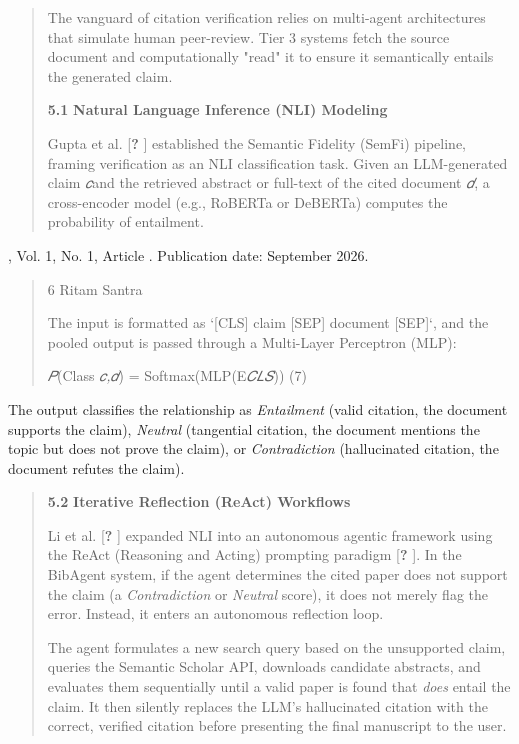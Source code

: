 \documentclass[
]{article}
\begin{document}
\begin{quote}
The vanguard of citation verification relies on multi-agent
architectures that simulate human peer-review. Tier 3 systems fetch the
source document and computationally "read" it to ensure it semantically
entails the generated claim.

\textbf{5.1} \textbf{Natural Language Inference (NLI) Modeling}

Gupta et al. {[}\textbf{?} {]} established the Semantic Fidelity (SemFi)
pipeline, framing verification as an NLI classification task. Given an
LLM-generated claim \emph{𝑐}and the retrieved abstract or full-text of
the cited document \emph{𝑑}, a cross-encoder model (e.g., RoBERTa or
DeBERTa) computes the probability of entailment.
\end{quote}

, Vol. 1, No. 1, Article . Publication date: September 2026.

\begin{quote}
6 Ritam Santra

The input is formatted as `{[}CLS{]} claim {[}SEP{]} document
{[}SEP{]}`, and the pooled output is passed through a Multi-Layer
Perceptron (MLP):

\emph{𝑃}(Class \textbar{} \emph{𝑐,𝑑}) = Softmax(MLP(E\emph{𝐶𝐿𝑆})) (7)
\end{quote}

The output classifies the relationship as \emph{Entailment} (valid
citation, the document supports the claim), \emph{Neutral} (tangential
citation, the document mentions the topic but does not prove the claim),
or \emph{Contradiction} (hallucinated citation, the document refutes the
claim).

\begin{quote}
\textbf{5.2} \textbf{Iterative Reflection (ReAct) Workflows}

Li et al. {[}\textbf{?} {]} expanded NLI into an autonomous agentic
framework using the ReAct (Reasoning and Acting) prompting paradigm
{[}\textbf{?} {]}. In the BibAgent system, if the agent determines the
cited paper does not support the claim (a \emph{Contradiction} or
\emph{Neutral} score), it does not merely flag the error. Instead, it
enters an autonomous reflection loop.

The agent formulates a new search query based on the unsupported claim,
queries the Semantic Scholar API, downloads candidate abstracts, and
evaluates them sequentially until a valid paper is found that
\emph{does} entail the claim. It then silently replaces the LLM's
hallucinated citation with the correct, verified citation before
presenting the final manuscript to the user.
\end{quote}
\end{document}
